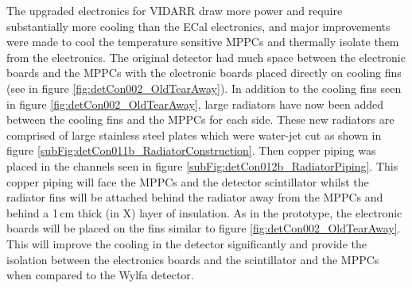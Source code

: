 The upgraded electronics for VIDARR draw more power and require substantially more cooling than the ECal electronics, and major improvements were made to cool the temperature sensitive MPPCs and thermally isolate them from the electronics. The original detector had much space between the electronic boards and the MPPCs with the electronic boards placed directly on cooling fins (see in figure \ref{fig:detCon002_OldTearAway}). In addition to the cooling fins seen in figure \ref{fig:detCon002_OldTearAway}, large radiators have now been added between the cooling fins and the MPPCs for each side. These new radiators are comprised of large stainless steel plates which were water-jet cut as shown in figure \ref{subFig:detCon011b_RadiatorConstruction}. Then copper piping was placed in the channels seen in figure \ref{subFig:detCon012b_RadiatorPiping}. This copper piping will face the MPPCs and the detector scintillator whilst the radiator fins will be attached behind the radiator away from the MPPCs and behind a 1\,cm thick (in X) layer of insulation. As in the prototype, the electronic boards will be placed on the fins similar to figure \ref{fig:detCon002_OldTearAway}. This will improve the cooling in the detector significantly and provide the isolation between the electronics boards and the scintillator and the MPPCs when compared to the Wylfa detector. 


